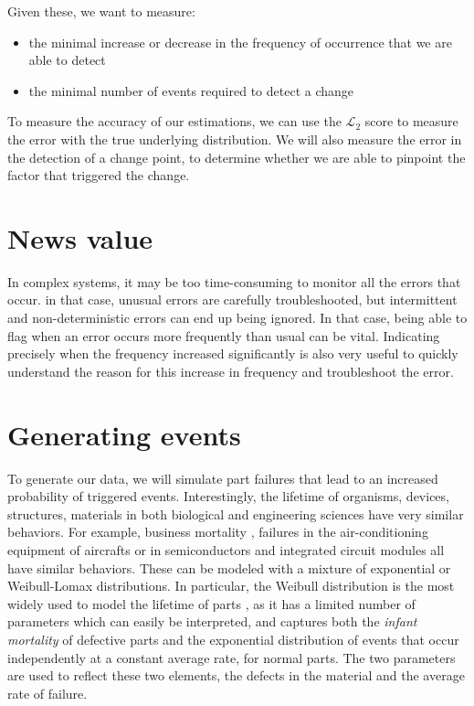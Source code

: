 \documentclass{kththesis}
\begin{document}
Given these, we want to measure:

\begin{itemize}

\item the minimal increase or decrease in the frequency of occurrence that we are able to detect
\item the minimal number of events required to detect a change

\end{itemize}

To measure the accuracy of our estimations, we can use the $\mathcal{L}_2$ score to measure the error with the true underlying distribution. We will also measure the error in the detection of a change point, to determine whether we are able to pinpoint the factor that triggered the change.

\section{News value}


In complex systems, it may be too time-consuming to monitor all the errors that occur. in that case, unusual errors are carefully troubleshooted, but intermittent and non-deterministic errors can end up being ignored. In that case, being able to flag when an error occurs more frequently than usual can be vital. Indicating precisely when the frequency increased significantly is also very useful to quickly understand the reason for this increase in frequency and troubleshoot the error.

\section{Generating events}
\label{part-lifetime}

To generate our data, we will simulate part failures that lead to an increased probability of triggered events. Interestingly, the lifetime of organisms, devices, structures, materials in both biological and engineering sciences have very similar behaviors. 
For example, business mortality \parencite{lomax1954}, failures in the air-conditioning equipment of aircrafts or in semiconductors \parencite{proschan1963} and integrated circuit modules \parencite{saunders1983} all have similar behaviors. 
These can be modeled with a mixture of exponential or Weibull-Lomax distributions. In particular, the Weibull distribution \parencite{weibull1951} is the most widely used to model the lifetime of parts \parencite{anderson2005}, as it has a limited number of parameters which can easily be interpreted, and captures both the \emph{infant mortality} of defective parts and the exponential distribution of events that occur independently at a constant average rate, for normal parts. The two parameters are used to reflect these two elements, the defects in the material and the average rate of failure.
\end{document}
